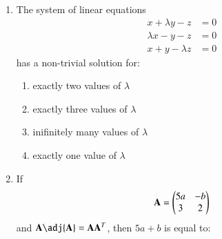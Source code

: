 \documentclass[journal,onecolumn]{IEEEtran}
\theoremstyle{remark}
\begin{document}
\begin{enumerate}
\begin{enumerate}
	\end{enumerate}


	\item The system of linear equations 
	\begin{align*}
		x+\lambda y-z &= 0\\
		\lambda x-y-z &= 0\\
		x+y-\lambda z &= 0
	\end{align*}
	has a non-trivial solution for:

	\hfill{}
	\begin{enumerate}
		\item exactly two values of $\lambda$ 
		\item exactly three values of $\lambda$ 
		\item inifinitely many values of $\lambda$
		\item exactly one value of $\lambda$ 
	\end{enumerate}


\item If \begin{align*} \mathbf{A} = \begin{pmatrix}5a&-b\\3&2\end{pmatrix}\end{align*} and $\vec{A} \adj{\vec{A}} = \vec{A}\vec{A}^{T}$, then $5a + b$ is equal to: 
	\hfill{}
	\begin{enumerate}

	\end{enumerate}


\end{enumerate}
\end{document}
